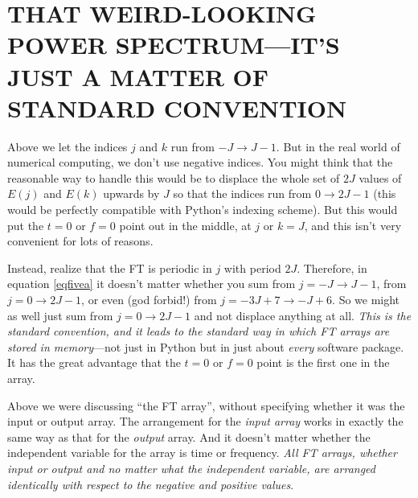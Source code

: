 \documentclass[preprint]{aastex}
\begin{document}
\section{THAT WEIRD-LOOKING POWER SPECTRUM---IT'S JUST A MATTER OF 
STANDARD CONVENTION}

          Above we let the indices $j$ and $k$ run from $-J \rightarrow
J-1$.  But in the real world of numerical computing, we don't use
negative indices.  You might think that the reasonable way to handle
this would be to displace the whole set of $2J$ values of $E(j)$ and
$E(k)$ upwards by $J$ so that the indices run from $0 \rightarrow 2J-1$
(this would be perfectly compatible with Python's indexing scheme).  But
this would put the $t=0$ or $f=0$ point out in the middle, at $j$ or
$k=J$, and this isn't very convenient for lots of reasons. 

          Instead, realize that the FT is periodic in $j$ with period
$2J$.  Therefore, in equation \ref{eqfivea} it doesn't matter whether you sum from
$j = -J \to J-1$, from $j = 0 \to 2J-1$, or even (god forbid!) from $j =
-3J + 7 \to -J + 6$.  So we might as well just sum from $j = 0 \to 2J-1$
and not displace anything at all.  {\it This is the standard convention,
and it leads to the standard way in which FT arrays are stored in
memory}---not just in Python but in just about {\it every} software
package.  It has the great advantage that the $t=0$ or $f=0$ point is
the first one in the array. 

          Above we were discussing ``the FT array'', without specifying
whether it was the input or output array.  The arrangement for the {\it
input array} works in exactly the same way as that for the {\it output}
array.  And it doesn't matter whether the independent variable for the
array is time or frequency.  {\it All FT arrays, whether input or output
and no matter what the independent variable, are arranged {\it
identically} with respect to the negative and positive values}. 
\end{document}
